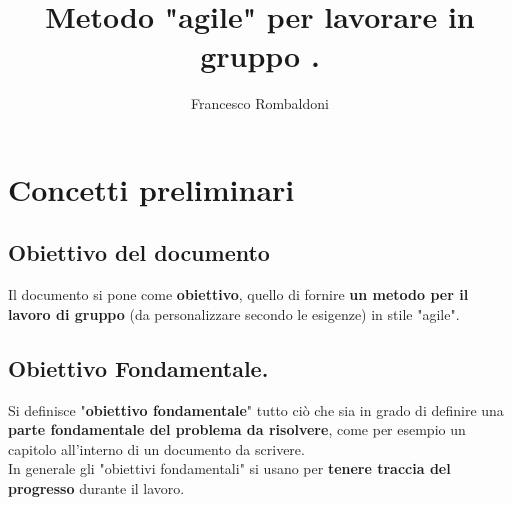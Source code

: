 \documentclass[11pt,a4paper]{article}
\begin{document}
	\title{Metodo "agile" per lavorare in gruppo .}
	\author{Francesco Rombaldoni}
	\date{}
	\maketitle
	\newpage
	
	\section{Concetti preliminari}
	\subsection{Obiettivo del documento}
	Il documento si pone come \textbf{obiettivo}, quello di fornire \textbf{un metodo per il lavoro di gruppo} (da personalizzare secondo le esigenze) in stile "agile".\\
	
	\subsection{Obiettivo Fondamentale.}
	Si definisce "\textbf{obiettivo fondamentale}" tutto ciò che sia in grado di definire una \textbf{parte fondamentale del problema da risolvere}, come per esempio un capitolo all'interno di un documento da scrivere.\\
	In generale gli "obiettivi fondamentali" si usano per \textbf{tenere traccia del progresso} durante il lavoro.\\
	
\end{document}
